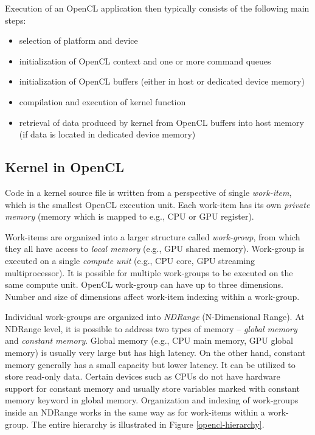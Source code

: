 \documentclass
[
    digital, %
    oneside, %
    table, %
    nolof, %
    nolot, %
    nocover %
]{fithesis3}
\begin{document}
Execution of an OpenCL application then typically consists of the following main steps:
\begin{itemize}
    \item selection of platform and device 
    \item initialization of OpenCL context and one or more command queues
    \item initialization of OpenCL buffers (either in host or dedicated device memory)
    \item compilation and execution of kernel function
    \item retrieval of data produced by kernel from OpenCL buffers into host memory (if data is located in dedicated device memory)
\end{itemize}

\subsection{Kernel in OpenCL}
\label{kernel}
Code in a kernel source file is written from a perspective of single \textit{work-item}, which is the smallest OpenCL execution unit. Each work-item
has its own \textit{private memory} (memory which is mapped to e.g., CPU or GPU register).

Work-items are organized into a larger structure called \textit{work-group}, from which they all have access to \textit{local memory} (e.g., GPU shared
memory). Work-group is executed on a single \textit{compute unit} (e.g., CPU core, GPU streaming multiprocessor). It is possible for multiple work-groups
to be executed on the same compute unit. OpenCL work-group can have up to three dimensions. Number and size of dimensions affect work-item indexing
within a work-group.

Individual work-groups are organized into \textit{NDRange} (N-Dimensional Range). At NDRange level, it is possible to address two types of memory --
\textit{global memory} and \textit{constant memory}. Global memory (e.g., CPU main memory, GPU global memory) is usually very large but has high
latency. On the other hand, constant memory generally has a small capacity but lower latency. It can be utilized to store read-only data. Certain devices
such as CPUs do not have hardware support for constant memory and usually store variables marked with constant memory keyword in global memory.
Organization and indexing of work-groups inside an NDRange works in the same way as for work-items within a work-group. The entire hierarchy is
illustrated in Figure \ref{opencl-hierarchy}.
\end{document}
